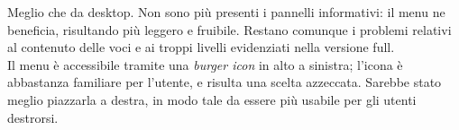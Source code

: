 Meglio che da desktop. Non sono più presenti i pannelli informativi: il menu ne beneficia, risultando più leggero e fruibile. Restano comunque i problemi relativi al contenuto delle voci e ai troppi livelli evidenziati nella versione full.\\
Il menu è accessibile tramite una \textit{burger icon} in alto a sinistra; l'icona è abbastanza familiare per l'utente, e risulta una scelta azzeccata. Sarebbe stato meglio piazzarla a destra, in modo tale da essere più usabile per gli utenti destrorsi.